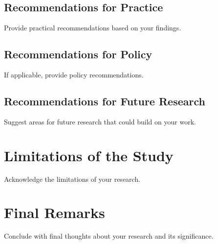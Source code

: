 \subsection{Recommendations for Practice}

Provide practical recommendations based on your findings.

\subsection{Recommendations for Policy}

If applicable, provide policy recommendations.

\subsection{Recommendations for Future Research}

Suggest areas for future research that could build on your work.

\section{Limitations of the Study}

Acknowledge the limitations of your research.

\section{Final Remarks}

Conclude with final thoughts about your research and its significance.
